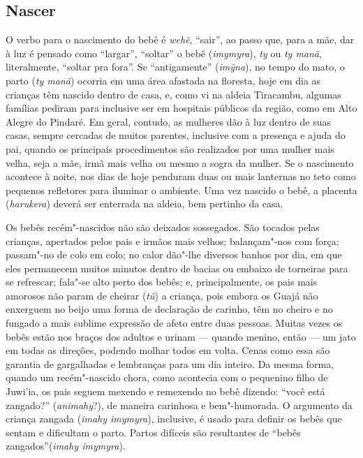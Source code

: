 \subsection{Nascer}

O verbo para o nascimento do bebê é \emph{wehẽ}, ``sair'', ao passo que,
para a mãe, dar à luz é pensado como ``largar'', ``soltar'' o bebê
(\emph{imymyra}), \emph{ty} ou \emph{ty manã}, literalmente, ``soltar pra
fora''. Se ``antigamente'' (\emph{imỹna}), no tempo do mato, o parto
(\emph{ty manã}) ocorria em uma área afastada na floresta, hoje em dia
as crianças têm nascido dentro de casa, e, como vi na aldeia Tiracambu,
algumas famílias pediram para inclusive ser em hospitais públicos da
região, como em Alto Alegre do Pindaré. Em geral, contudo, as mulheres
dão à luz dentro de suas casas, sempre cercadas de muitos parentes,
inclusive com a presença e ajuda do pai, quando os principais
procedimentos são realizados por uma mulher mais velha, seja a mãe, irmã
mais velha ou mesmo a sogra da mulher. Se o nascimento acontece à noite,
nos dias de hoje penduram duas ou mais lanternas no teto como pequenos
refletores para iluminar o ambiente. Uma vez nascido o bebê, a placenta
(\emph{harukera}) deverá ser enterrada na aldeia, bem pertinho da casa.

Os bebês recém"-nascidos não são deixados sossegados. São tocados pelas
crianças, apertados pelos pais e irmãos mais velhos; balançam"-nos com
força; passam"-no de colo em colo; no calor dão"-lhe diversos banhos por
dia, em que eles permanecem muitos minutos dentro de bacias ou embaixo
de torneiras para se refrescar; fala"-se alto perto dos bebês; e,
principalmente, os pais mais amorosos não param de cheirar (\emph{tũ}) a
criança, pois embora os Guajá não enxerguem no beijo uma forma de
declaração de carinho, têm no cheiro e no fungado a mais sublime
expressão de afeto entre duas pessoas. Muitas vezes os bebês estão nos
braços dos adultos e urinam --- quando menino, então --- um jato em todas as
direções, podendo molhar todos em volta. Cenas como essa são garantia de
gargalhadas e lembranças para um dia inteiro. Da mesma forma, quando um
recém"-nascido chora, como acontecia com o pequenino filho de Juwi'ia, os
pais seguem mexendo e remexendo no bebê dizendo: ``você está zangado?''
(\emph{animahy}?), de maneira carinhosa e bem"-humorada. O argumento da
criança zangada (\emph{imahy imymyra}), inclusive, é usado para definir
os bebês que sentam e dificultam o parto. Partos difíceis são
resultantes de ``bebês zangados''(\emph{imahy imymyra}).

